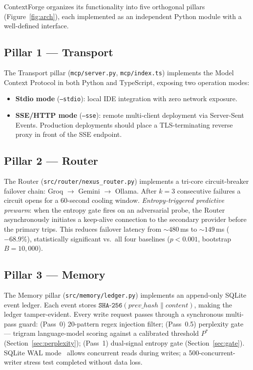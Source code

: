 \documentclass[11pt,twocolumn]{article}
\begin{document}
ContextForge organizes its functionality into five orthogonal pillars
(Figure~\ref{fig:arch}), each implemented as an independent Python module
with a well-defined interface.

\subsection{Pillar 1 --- Transport}

The Transport pillar (\texttt{mcp/server.py}, \texttt{mcp/index.ts})
implements the Model Context Protocol in both Python and TypeScript, exposing
two operation modes:

\begin{itemize}[leftmargin=*,topsep=2pt,itemsep=1pt]
  \item \textbf{Stdio mode} (\texttt{--stdio}): local IDE integration with
    zero network exposure.
  \item \textbf{SSE/HTTP mode} (\texttt{--sse}): remote multi-client deployment
    via Server-Sent Events. Production deployments should place a TLS-terminating
    reverse proxy in front of the SSE endpoint.
\end{itemize}

\subsection{Pillar 2 --- Router}

The Router (\texttt{src/router/nexus\_router.py}) implements a tri-core
circuit-breaker failover chain: Groq $\to$ Gemini $\to$ Ollama.
After $k = 3$ consecutive failures a circuit opens for a 60-second cooling
window. \emph{Entropy-triggered predictive prewarm}: when the entropy gate
fires on an adversarial probe, the Router asynchronously initiates a
keep-alive connection to the secondary provider before the primary trips.
This reduces failover latency from ${\sim}480$\,ms to ${\sim}149$\,ms
($-68.9\%$), statistically significant vs.\ all four baselines
($p < 0.001$, bootstrap $B=10{,}000$).

\subsection{Pillar 3 --- Memory}

The Memory pillar (\texttt{src/memory/ledger.py}) implements an append-only
SQLite event ledger. Each event stores
$\texttt{SHA-256}(\mathit{prev\_hash} \| \mathit{content})$, making the
ledger tamper-evident. Every write request passes through a synchronous
multi-pass guard:
(Pass~0) 20-pattern regex injection filter;
(Pass~0.5) perplexity gate --- trigram language-model scoring against a
calibrated threshold $P^{*}$ (Section~\ref{sec:perplexity});
(Pass~1) dual-signal entropy gate (Section~\ref{sec:gate}).
SQLite WAL mode~\cite{hipp2020sqlite} allows concurrent reads during writes;
a 500-concurrent-writer stress test completed without data loss.
\end{document}
